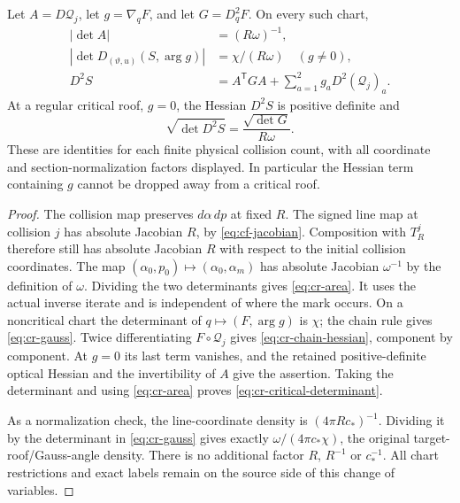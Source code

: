 \begin{theorem}
\label{thm:cr-jacobian}
Let $A=D\mathcal Q_j$, let $g=\nabla_q F$, and let $G=D_q^2F$.
On every such chart,
\begin{align}
 |\det A|&=(R\omega)^{-1},\label{eq:cr-area}\\
 |\det D_{(\vartheta,u)}(S,\arg g)|
    &=\chi/(R\omega) \quad (g\ne0),\label{eq:cr-gauss}\\
 D^2S&=A^{\mathsf T}GA+
                \sum_{a=1}^2g_aD^2(\mathcal Q_j)_a.
                  \label{eq:cr-chain-hessian}
\end{align}
At a regular critical roof, $g=0$, the Hessian $D^2S$ is positive
definite and
\begin{equation}\label{eq:cr-critical-determinant}
 \sqrt{\det D^2S}=\frac{\sqrt{\det G}}{R\omega}.
\end{equation}
These are identities for each finite physical collision count, with
all coordinate and section-normalization factors displayed. In
particular the Hessian term containing $g$ cannot be dropped away
from a critical roof.
\end{theorem}
\begin{proof}
The collision map preserves $d\alpha\,dp$ at fixed $R$. The signed
line map at collision $j$ has absolute Jacobian $R$, by
\eqref{eq:cf-jacobian}. Composition with $T_R^j$ therefore still has
absolute Jacobian $R$ with respect to the initial collision
coordinates. The map $(\alpha_0,p_0)\mapsto(\alpha_0,\alpha_m)$ has
absolute Jacobian $\omega^{-1}$ by the definition of $\omega$.
Dividing the two determinants gives \eqref{eq:cr-area}. It uses the
actual inverse iterate and is independent of where the mark occurs.
On a noncritical chart the determinant of
$q\mapsto(F,\arg g)$ is $\chi$; the chain rule gives
\eqref{eq:cr-gauss}. Twice differentiating $F\circ\mathcal Q_j$
gives \eqref{eq:cr-chain-hessian}, component by component. At $g=0$
its last term vanishes, and the retained positive-definite optical
Hessian and the invertibility of $A$ give the assertion. Taking the
determinant and using \eqref{eq:cr-area} proves
\eqref{eq:cr-critical-determinant}.

As a normalization check, the line-coordinate density is
$(4\pi Rc_*)^{-1}$. Dividing it by the determinant in
\eqref{eq:cr-gauss} gives exactly $\omega/(4\pi c_*\chi)$, the
original target-roof/Gauss-angle density. There is no additional
factor $R$, $R^{-1}$ or $c_*^{-1}$. All chart restrictions and exact
labels remain on the source side of this change of variables.
\end{proof}

